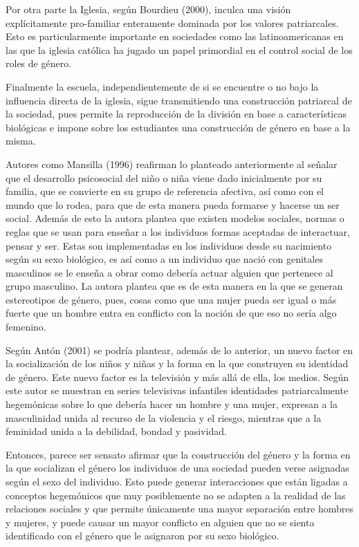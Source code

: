 Por otra parte la Iglesia, según Bourdieu (2000), inculca una visión
explícitamente pro-familiar enteramente dominada por los valores patriarcales.
Esto es particularmente importante en sociedades como las latinoamericanas en
las que la iglesia católica ha jugado un papel primordial en el control
social de los roles de género.

Finalmente la escuela, independientemente de si se encuentre o no bajo la
influencia directa de la iglesia, sigue transmitiendo una construcción
patriarcal de la sociedad, pues permite la reproducción de la división en base a
características biológicas e impone sobre los estudiantes una construcción de
género en base a la misma.

Autores como Mansilla (1996) reafirman lo planteado anteriormente al señalar que
el desarrollo psicosocial del niño o niña viene dado inicialmente por su
familia, que se convierte en su grupo de referencia afectiva, así como con el
mundo que lo rodea, para que de esta manera  pueda formarse y hacerse un ser
social.
Además de esto la autora plantea que existen modelos sociales, normas o reglas
que se usan para enseñar a los individuos formas aceptadas de interactuar,
pensar y ser.
Estas son implementadas en los individuos desde su nacimiento según su sexo
biológico, es así como a un individuo que nació con genitales masculinos se le
enseña a obrar como debería actuar alguien que pertenece al grupo masculino.
La autora plantea que es de esta manera en la que se generan estereotipos de
género, pues, cosas como que una mujer pueda ser igual o más fuerte que un
hombre entra en conflicto con la noción de que eso no sería algo femenino.

Según Antón (2001) se podría plantear, además de lo anterior, un nuevo factor en
la socialización de los niños y niñas y la forma en la que construyen su
identidad de género.
Este nuevo factor es la televisión y más allá de ella, los medios.
Según este autor se muestran en series televisivas infantiles identidades
patriarcalmente hegemónicas sobre lo que debería hacer un hombre y una mujer,
expresan a la masculinidad unida al recurso de la violencia y el riesgo,
mientras que a la feminidad unida a la debilidad, bondad y pasividad.

Entonces, parece ser sensato afirmar que la construcción del género y la forma
en la que socializan el género los individuos de una sociedad pueden verse
asignadas según el sexo del individuo.
Esto puede generar interacciones que están ligadas a conceptos hegemónicos
que muy posiblemente no se adapten a la realidad de las relaciones sociales y
que permite únicamente una mayor separación entre hombres y mujeres, y puede
causar un mayor conflicto en alguien que no se sienta identificado con el
género que le asignaron por su sexo biológico.

